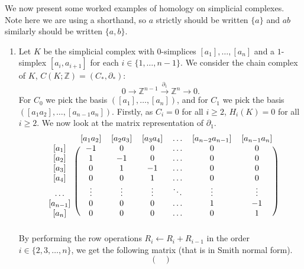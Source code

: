\begin{example}
    We now present some worked examples of homology on simplicial complexes. Note here we are using a shorthand, so $a$ strictly should be written $\{a\}$ and $ab$ similarly should be written $\{a, b\}$.
    \begin{enumerate}
        \item Let $K$ be the simplicial complex with $0$-simplices $[a_1], \ldots, [a_n]$ and a $1$-simplex $[a_i,a_{i+1}]$ for each $i \in \{1, \ldots, n-1\}$. We consider the chain complex of $K$, $C(K;\mathbb Z) = (C_*, \partial_*)$:
              \[ 0 \to \mathbb Z^{n-1} \xrightarrow{\partial_1} \mathbb Z^n \to 0. \]
              For $C_0$ we pick the basis $([a_1], \ldots, [a_n])$, and for $C_1$ we pick the basis $([a_1a_2], \ldots, [a_{n-1}a_n])$. Firstly, as $C_i = 0$ for all $i \geq 2$, $H_i(K) = 0$ for all $i \geq 2$. We now look at the matrix representation of $\partial_1$.
              \[
                  \begin{blockarray}{ccccccc}
                      & [a_1a_2] & [a_2a_3] & [a_3a_4] & \ldots & [a_{n-2}a_{n-1}] & [a_{n-1}a_n] \\
                      \begin{block}{c(cccccc)}
                          {[a_1]} & -1     & 0      & 0      & \ldots & 0      & 0      \\
                          {[a_2]} & 1      & -1     & 0      & \ldots & 0      & 0      \\
                          {[a_3]} & 0      & 1      & -1     & \ldots & 0      & 0      \\
                          {[a_4]} & 0      & 0      & 1      & \ldots & 0      & 0      \\
                          \ldots & \vdots & \vdots & \vdots & \ddots & \vdots & \vdots \\
                          {[a_{n-1}]} & 0      & 0      & 0      & \ldots & 1      & -1     \\
                          {[a_n]} & 0      & 0      & 0      & \ldots & 0      & 1      \\
                      \end{block}
                  \end{blockarray}
              \]
              By performing the row operations $R_i \gets R_i + R_{i-1}$ in the order $i \in \{2, 3, \ldots, n\}$, we get the following matrix (that is in Smith normal form).
              \[
                  \begin{pmatrix}

\end{pmatrix}\]
\end{enumerate}
\end{example}
